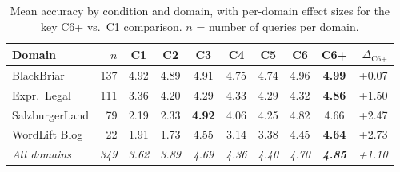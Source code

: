 \begin{table}[t]
\centering
\caption{Mean accuracy by condition and domain, with per-domain
effect sizes for the key C6+ vs.\ C1 comparison.
$n$ = number of queries per domain.}
\label{tab:domain}
\begin{tabular}{@{}lrcccccccr@{}}
\toprule
\textbf{Domain} & \textbf{$n$} & \textbf{C1} & \textbf{C2} & \textbf{C3} & \textbf{C4} & \textbf{C5} & \textbf{C6} & \textbf{C6+} & \textbf{$\Delta_{\text{C6+}}$} \\
\midrule
BlackBriar & 137 & 4.92 & 4.89 & 4.91 & 4.75 & 4.74 & 4.96 & \textbf{4.99} & +0.07 \\
Expr.\ Legal & 111 & 3.36 & 4.20 & 4.29 & 4.33 & 4.29 & 4.32 & \textbf{4.86} & +1.50 \\
SalzburgerLand & 79 & 2.19 & 2.33 & \textbf{4.92} & 4.06 & 4.25 & 4.82 & 4.66 & +2.47 \\
WordLift Blog & 22 & 1.91 & 1.73 & 4.55 & 3.14 & 3.38 & 4.45 & \textbf{4.64} & +2.73 \\
\midrule
\textit{All domains} & \textit{349} & \textit{3.62} & \textit{3.89} & \textit{4.69} & \textit{4.36} & \textit{4.40} & \textit{4.70} & \textit{\textbf{4.85}} & \textit{+1.10} \\
\bottomrule
\end{tabular}
\end{table}